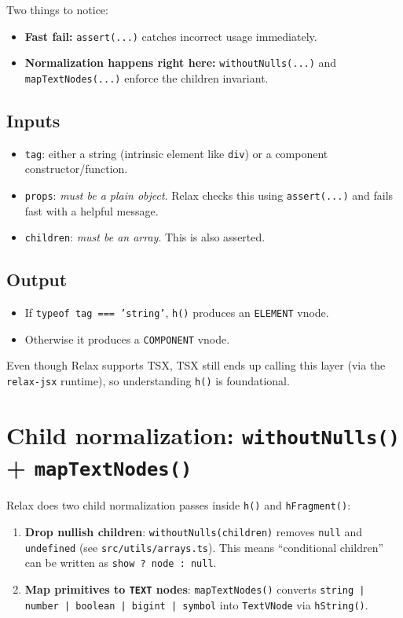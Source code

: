 Two things to notice:

\begin{itemize}
  \item \textbf{Fast fail:} \texttt{assert(...)} catches incorrect usage immediately.
  \item \textbf{Normalization happens right here:} \texttt{withoutNulls(...)} and \texttt{mapTextNodes(...)} enforce the children invariant.
\end{itemize}

\subsection*{Inputs}
\begin{itemize}
  \item \texttt{tag}: either a string (intrinsic element like \texttt{div}) or a component constructor/function.
  \item \texttt{props}: \emph{must be a plain object}. Relax checks this using \texttt{assert(...)} and fails fast with a helpful message.
  \item \texttt{children}: \emph{must be an array}. This is also asserted.
\end{itemize}

\subsection*{Output}
\begin{itemize}
  \item If \texttt{typeof tag === 'string'}, \texttt{h()} produces an \texttt{ELEMENT} vnode.
  \item Otherwise it produces a \texttt{COMPONENT} vnode.
\end{itemize}

Even though Relax supports TSX, TSX still ends up calling this layer (via the \texttt{relax-jsx} runtime), so understanding \texttt{h()} is foundational.

\section{Child normalization: \texttt{withoutNulls()} + \texttt{mapTextNodes()}}
Relax does two child normalization passes inside \texttt{h()} and \texttt{hFragment()}:

\begin{enumerate}
  \item \textbf{Drop nullish children}: \texttt{withoutNulls(children)} removes \texttt{null} and \texttt{undefined} (see \texttt{src/utils/arrays.ts}). This means ``conditional children'' can be written as \texttt{show ? node : null}.
  \item \textbf{Map primitives to \texttt{TEXT} nodes}: \texttt{mapTextNodes()} converts \texttt{string | number | boolean | bigint | symbol} into \texttt{TextVNode} via \texttt{hString()}.
\end{enumerate}

